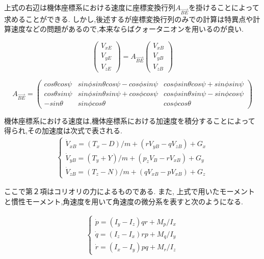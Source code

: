 \documentclass[a4paper]{jarticle}
\begin{document}
上式の右辺は機体座標系における速度に座標変換行列$A_{\overrightarrow{BE}}$を掛けることによって求めることができる.
しかし,後述するが座標変換行列のみでの計算は特異点や計算速度などの問題があるので,本来ならばクォータニオンを用いるのが良い.

\begin{equation}
\left(
  \begin{array}{ccc}
    V_{xE} \\
    V_{yE} \\
    V_{zE}  
  \end{array}
\right)=A_{ \overrightarrow{BE} }
\left(
  \begin{array}{ccc}
    V_{xB} \\
    V_{yB} \\
    V_{zB}  
  \end{array}
\right)
\end{equation}


\begin{equation}
A_{ \overrightarrow{BE} }=
\left(
  \begin{array}{ccc}
    cos \theta cos \psi & sin \phi sin \theta cos \psi - cos \phi sin \psi & cos \phi sin \theta cos \psi + sin \phi sin \psi \\
    cos \theta sin \psi & sin \phi sin \theta sin \psi + cos \phi cos \psi & cos \phi sin \theta sin \psi - sin \phi cos \psi \\
    -sin \theta & sin \phi cos \theta &cos \phi cos \theta
  \end{array}
\right)
\end{equation}

機体座標系における速度は,機体座標系における加速度を積分することによって得られ,その加速度は次式で表される.　
\begin{eqnarray}
    \begin{cases}
      \dot V_{xB} = (T_x-D)/m + (rV_{yB}-qV_{zB})+G_x \\
      \dot V_{yB} = (T_y+Y)/m + (p_zV_B-rV_{xB})+G_y \\
      \dot V_{zB} = (T_z-N)/m + (qV_{xB}-pV_{xB})+G_z
    \end{cases}
\end{eqnarray}  

ここで第２項はコリオリの力によるものである.
また, 上式で用いたモーメントと慣性モーメント,角速度を用いて角速度の微分系を表すと次のようになる.

\begin{eqnarray}
  \begin{cases}
    \dot p = {(I_y-I_z)qr+M_p}/I_x \\
    \dot q = {(I_z-I_x)rp+M_q}/I_y \\
    \dot r = {(I_x-I_y)pq+M_r}/I_z 
  \end{cases}
\end{eqnarray}
\end{document}
